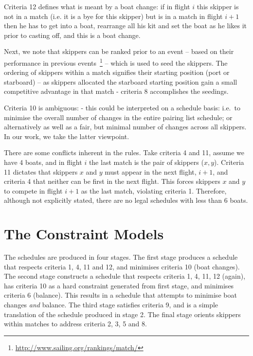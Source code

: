 \documentclass{llncs}
\begin{document}
Criteria 12 defines what is meant by a boat change: if in flight $i$ this skipper is not in a match (i.e. it is a bye for this skipper) but is in a match in flight $i+1$ then he has to get into a boat, rearrange all his kit and set the boat as he likes it prior to casting off, and this is a boat change.

Next, we note that skippers can be ranked prior to an event -- based on their performance in previous events~\footnote{\url{http://www.sailing.org/rankings/match/}} -- which is used to seed the skippers. The ordering of skippers within a match signifies their starting position (port or starboard) -- as skippers allocated the starboard starting position gain a small competitive advantage in that match - criteria 8 accomplishes the seedings.

Criteria 10 is ambiguous: - this could be interpreted on a schedule basis: i.e.\ to minimise the overall number of changes in the entire pairing list schedule; or alternatively as well as a fair, but minimal number of changes across all skippers. In our work, we take the latter viewpoint.

There are some conflicts inherent in the rules. Take criteria 4 and 11, assume we have 4 boats, and in flight $i$ the last match is the pair of skippers ($x,y$). Criteria 11 dictates that skippers $x$ and $y$ must appear in the next flight, $i+1$, and criteria 4 that neither can be first in the next flight. This forces skippers $x$ and $y$ to compete in flight $i+1$ as the last match, violating criteria 1. Therefore, although not explicitly stated, there are no legal schedules with less than 6 boats.

\section{The Constraint Models}\label{sec:models}

The schedules are produced in four stages. The first stage produces a schedule
that respects criteria 1, 4, 11 and 12, and minimises criteria 10 (boat
changes). The second stage constructs a schedule that respects criteria 1, 4,
11, 12 (again), has criteria 10 as a hard constraint generated from first
stage, and minimises criteria 6 (balance). This results in a schedule that
attempts to minimise boat changes \emph{and} balance. The third stage satisfies
criteria 9, and is a simple translation of the schedule produced in stage 2.
The final stage orients skippers within matches to address criteria 2, 3, 5
and 8.
\end{document}

